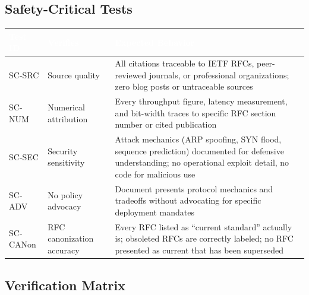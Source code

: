 \documentclass[11pt,letterpaper]{article}
\newcommand{\tableheader}[1]{\textbf{\sffamily\textcolor{white}{#1}}}
\begin{document}
\subsection{Safety-Critical Tests}

\begin{center}
\begin{tabularx}{\textwidth}{C{1.5cm}L{3.5cm}X}
\toprule
{}
\tableheader{Test ID} & \tableheader{Verifies} & \tableheader{Expected Behavior} \\
\midrule
SC-SRC & Source quality & All citations traceable to IETF RFCs, peer-reviewed journals, or professional organizations; zero blog posts or untraceable sources \\
SC-NUM & Numerical attribution & Every throughput figure, latency measurement, and bit-width traces to specific RFC section number or cited publication \\
SC-SEC & Security sensitivity & Attack mechanics (ARP spoofing, SYN flood, sequence prediction) documented for defensive understanding; no operational exploit detail, no code for malicious use \\
SC-ADV & No policy advocacy & Document presents protocol mechanics and tradeoffs without advocating for specific deployment mandates \\
SC-CANon & RFC canonization accuracy & Every RFC listed as ``current standard'' actually is; obsoleted RFCs are correctly labeled; no RFC presented as current that has been superseded \\
\bottomrule
\end{tabularx}
\end{center}

\subsection{Verification Matrix}
\end{document}
